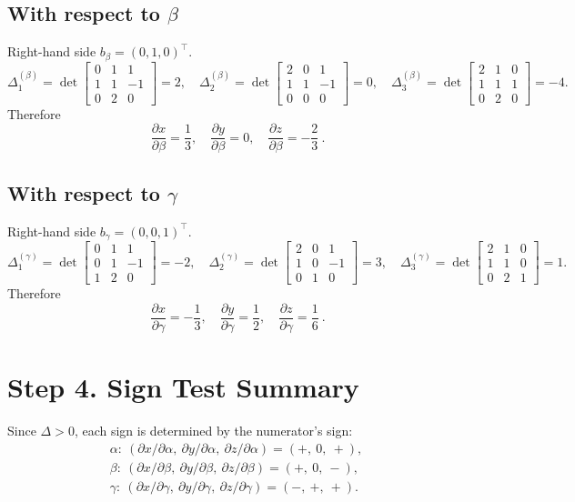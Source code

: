 \documentclass[12pt]{article}
\begin{document}
\subsection*{With respect to $\beta$}
Right-hand side $b_\beta=(0,1,0)^\top$.
\[
\Delta_1^{(\beta)}=
\det\!\begin{bmatrix}
0 & 1 & 1\\
1 & 1 & -1\\
0 & 2 & 0
\end{bmatrix}=2,\quad
\Delta_2^{(\beta)}=
\det\!\begin{bmatrix}
2 & 0 & 1\\
1 & 1 & -1\\
0 & 0 & 0
\end{bmatrix}=0,\quad
\Delta_3^{(\beta)}=
\det\!\begin{bmatrix}
2 & 1 & 0\\
1 & 1 & 1\\
0 & 2 & 0
\end{bmatrix}=-4.
\]
Therefore
\[
\boxed{\ \frac{\partial x}{\partial \beta}=\frac{1}{3},\quad
\frac{\partial y}{\partial \beta}=0,\quad
\frac{\partial z}{\partial \beta}=-\frac{2}{3}\ }.
\]

\subsection*{With respect to $\gamma$}
Right-hand side $b_\gamma=(0,0,1)^\top$.
\[
\Delta_1^{(\gamma)}=
\det\!\begin{bmatrix}
0 & 1 & 1\\
0 & 1 & -1\\
1 & 2 & 0
\end{bmatrix}=-2,\quad
\Delta_2^{(\gamma)}=
\det\!\begin{bmatrix}
2 & 0 & 1\\
1 & 0 & -1\\
0 & 1 & 0
\end{bmatrix}=3,\quad
\Delta_3^{(\gamma)}=
\det\!\begin{bmatrix}
2 & 1 & 0\\
1 & 1 & 0\\
0 & 2 & 1
\end{bmatrix}=1.
\]
Therefore
\[
\boxed{\ \frac{\partial x}{\partial \gamma}=-\frac{1}{3},\quad
\frac{\partial y}{\partial \gamma}=\frac{1}{2},\quad
\frac{\partial z}{\partial \gamma}=\frac{1}{6}\ }.
\]

\section*{Step 4. Sign Test Summary}
Since $\Delta>0$, each sign is determined by the numerator's sign:
\[
\begin{array}{lcl}
\alpha:\ (\partial x/\partial\alpha,\ \partial y/\partial\alpha,\ \partial z/\partial\alpha)=(+,\ 0,\ +),\\[4pt]
\beta:\ (\partial x/\partial\beta,\ \partial y/\partial\beta,\ \partial z/\partial\beta)=(+,\ 0,\ -),\\[4pt]
\gamma:\ (\partial x/\partial\gamma,\ \partial y/\partial\gamma,\ \partial z/\partial\gamma)=(-,\ +,\ +).
\end{array}
\]
\end{document}
